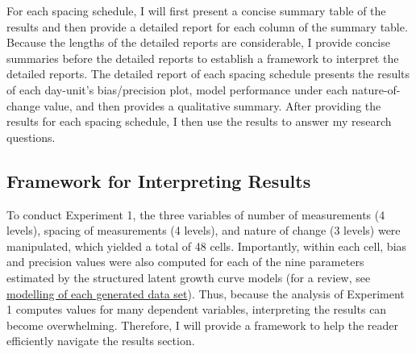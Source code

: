 \documentclass[
12pt, %
twoside,
english]{guelphthesis}
\begin{document}
For each spacing schedule, I will first present a concise summary table of the results and then provide a detailed report for each column of the summary table. Because the lengths of the detailed reports are considerable, I provide concise summaries before the detailed reports to establish a framework to interpret the detailed reports. The detailed report of each spacing schedule presents the results of each day-unit's bias/precision plot, model performance under each nature-of-change value, and then provides a qualitative summary. After providing the results for each spacing schedule, I then use the results to answer my research questions.

\hypertarget{framework-for-interpreting-results}{%
\subsection{Framework for Interpreting Results}\label{framework-for-interpreting-results}}

To conduct Experiment 1, the three variables of number of measurements (4 levels), spacing of measurements (4 levels), and nature of change (3 levels) were manipulated, which yielded a total of 48 cells. Importantly, within each cell, bias and precision values were also computed for each of the nine parameters estimated by the structured latent growth curve models (for a review, see \protect\hyperlink{modelling-data-sets}{modelling of each generated data set}). Thus, because the analysis of Experiment 1 computes values for many dependent variables, interpreting the results can become overwhelming. Therefore, I will provide a framework to help the reader efficiently navigate the results section.
\end{document}
